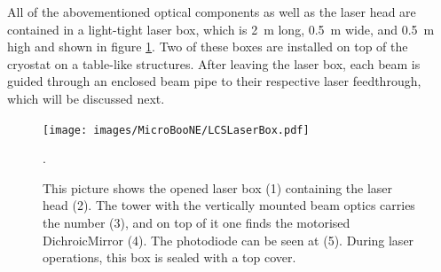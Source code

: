 All of the abovementioned optical components as well as the laser head are contained in a light-tight laser box, which is \SI{2}{\metre} long, \SI{0.5}{\metre} wide, and \SI{0.5}{\metre} high and shown in figure \ref{fig:LaserBox}. Two of these boxes are installed on top of the cryostat on a table-like structures. After leaving the laser box, each beam is guided through an enclosed beam pipe to their respective laser feedthrough, which will be discussed next.
\begin{figure}[htbp]
    \centering
    \texttt{[image: images/MicroBooNE/LCSLaserBox.pdf]}     
    \caption[LCS Laser Box]{This picture shows the opened laser box (1) containing the laser head (2). The tower with the vertically mounted beam optics carries the number (3), and on top of it one finds the motorised \gls{DichroicMirror} (4). The photodiode can be seen at (5). During laser operations, this box is sealed with a top cover.}.
    \label{fig:LaserBox}
\end{figure}

